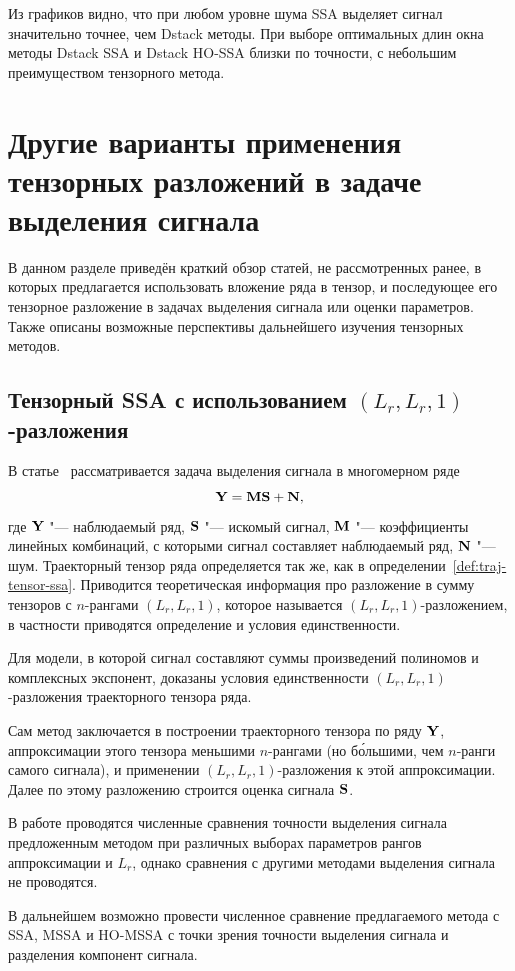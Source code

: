 \documentclass[specialist,
  substylefile=spbu_report.rtx,
subf,href,colorlinks=true, 12pt]{disser}
\theoremstyle{plain}
\theoremstyle{definition}
\theoremstyle{remark}
\begin{document}
Из графиков видно, что при любом уровне шума SSA выделяет сигнал
значительно точнее, чем Dstack методы.
При выборе оптимальных длин окна методы Dstack SSA и Dstack HO-SSA
близки по точности, с небольшим преимуществом тензорного метода.

\section{Другие варианты применения тензорных разложений в задаче
выделения сигнала}\label{sec:review}
В данном разделе приведён краткий обзор статей, не рассмотренных
ранее, в которых предлагается использовать вложение ряда в тензор, и
последующее его тензорное разложение в задачах выделения сигнала или
оценки параметров.
Также описаны возможные перспективы дальнейшего изучения тензорных методов.

\subsection{Тензорный SSA с использованием {$(L_r, L_r, 1)$}-разложения}
\label{subsec:review-lrlr1}
В статье~\cite{DeLathauwer2011} рассматривается задача выделения
сигнала в многомерном ряде
\[
  \mathbf{Y} = \mathbf{M} \mathbf{S} + \mathbf{N},
\]
где $\mathbf{Y}$ "--- наблюдаемый ряд, $\mathbf{S}$ "--- искомый сигнал, $\mathbf{M}$
"--- коэффициенты линейных комбинаций, с которыми сигнал составляет
наблюдаемый ряд, $\mathbf{N}$ "--- шум.
Траекторный тензор ряда определяется так же, как в
определении~\ref{def:traj-tensor-ssa}.
Приводится теоретическая информация про разложение в сумму тензоров с
$n$-рангами $(L_r, L_r, 1)$, которое называется $(L_r, L_r,
1)$-разложением, в частности приводятся определение и условия единственности.

Для модели, в которой сигнал составляют суммы произведений полиномов
и комплексных экспонент, доказаны условия единственности $(L_r, L_r,
1)$-разложения траекторного тензора ряда.

Сам метод заключается в построении траекторного тензора по ряду $\mathbf{Y}$,
аппроксимации этого тензора меньшими $n$-рангами (но б\'{о}льшими, чем
$n$-ранги самого сигнала), и применении $(L_r, L_r, 1)$-разложения к
этой аппроксимации.
Далее по этому разложению строится оценка сигнала $\mathbf{S}$.

В работе проводятся численные сравнения точности выделения сигнала
предложенным методом при различных выборах параметров рангов
аппроксимации и $L_r$, однако сравнения с другими методами выделения
сигнала не проводятся.

В дальнейшем возможно провести численное сравнение предлагаемого
метода с SSA, MSSA и HO-MSSA с точки зрения точности выделения
сигнала и разделения компонент сигнала.
\end{document}
